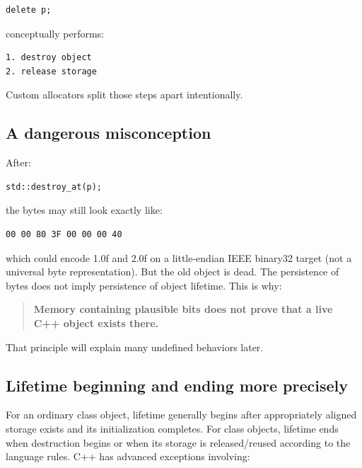 \begin{verbatim}
delete p;
\end{verbatim}

conceptually performs:

\begin{verbatim}
1. destroy object
2. release storage
\end{verbatim}

Custom allocators split those steps apart intentionally.

\subsection{A dangerous misconception}\label{05-engine-i-ch002-a-dangerous-misconception}

\hypertarget{05-engine-i-ch002-a-dangerous-misconception}{}

After:

\begin{verbatim}
std::destroy_at(p);
\end{verbatim}

the bytes may still look exactly like:

\begin{verbatim}
00 00 80 3F 00 00 00 40
\end{verbatim}

which could encode 1.0f and 2.0f on a little-endian IEEE binary32 target (not a universal byte representation). But the old  object is dead. The persistence of bytes does not imply persistence of object lifetime. This is why:

\begin{quote}
\textbf{Memory containing plausible bits does not prove that a live C++ object exists there.}
\end{quote}

That principle will explain many undefined behaviors later.

\subsection{Lifetime beginning and ending more precisely}\label{05-engine-i-ch002-lifetime-beginning-and-ending-more-precisely}

\hypertarget{05-engine-i-ch002-lifetime-beginning-and-ending-more-precisely}{}

For an ordinary class object, lifetime generally begins after appropriately aligned storage exists and its initialization completes. For class objects, lifetime ends when destruction begins or when its storage is released/reused according to the language rules. C++ has advanced exceptions involving:

